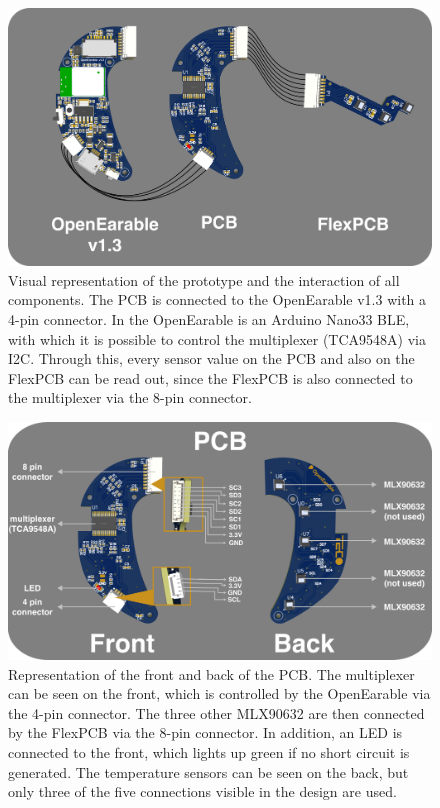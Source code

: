 \begin{figure}
    \centering
    \includegraphics[width=\textwidth]{thesis-doc/images/prototype/PrototypeConnection.png}
    \caption{Visual representation of the prototype and the interaction of all components. The PCB is connected to the OpenEarable v1.3 with a 4-pin connector. In the OpenEarable is an Arduino Nano33 BLE, with which it is possible to control the multiplexer (TCA9548A) via I2C. Through this, every sensor value on the PCB and also on the FlexPCB can be read out, since the FlexPCB is also connected to the multiplexer via the 8-pin connector.}
    \label{fig:design:prototype_connection}
\end{figure}

\begin{figure}
    \centering
    \includegraphics[width=\textwidth]{thesis-doc/images/prototype/PCB_Description.png}
    \caption{Representation of the front and back of the PCB. The multiplexer can be seen on the front, which is controlled by the OpenEarable via the 4-pin connector. The three other MLX90632 are then connected by the FlexPCB via the 8-pin connector. In addition, an LED is connected to the front, which lights up green if no short circuit is generated. The temperature sensors can be seen on the back, but only three of the five connections visible in the design are used.}
    \label{fig:design:pcb_description}
\end{figure}

